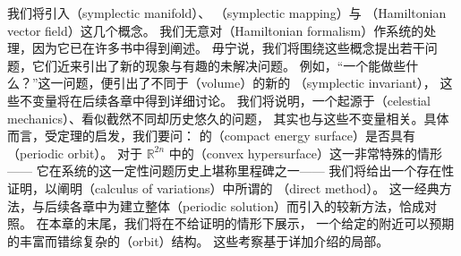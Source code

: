 
我们将引入\textbf{\trSymplecticManifold}（symplectic manifold）、%
\textbf{\trSymplecticMapping}（symplectic mapping）与%
\textbf{\trHamiltonianVectorField}（Hamiltonian vector field）这几个概念。%
我们无意对\textbf{\trHamiltonianFormalism}（Hamiltonian formalism）作系统的处理，因为它已在许多书中得到阐述。%
毋宁说，我们将围绕这些概念提出若干问题，它们近来引出了新的现象与有趣的未解决问题。%
例如，“一个\trSymplecticMapping{}能做些什么？”这一问题，便引出了不同于\textbf{\trVolume}（volume）的新的%
\textbf{\trSymplecticInvariant}（symplectic invariant），%
这些不变量将在后续各章中得到详细讨论。%
我们将说明，一个起源于\textbf{\trCelestialMechanics}（celestial mechanics）、看似截然不同却历史悠久的问题，%
其实也与这些不变量相关。具体而言，受\trPoincare{}\trRecurrence{}定理的启发，我们要问：%
\trHamiltonianVectorField{}的\textbf{\trCompact\trEnergySurface}（compact energy surface）是否具有\textbf{\trPeriodicOrbit}（periodic orbit）。%
对于 $\mathbb{R}^{2n}$ 中的\textbf{\trConvex\trHypersurface}（convex hypersurface）这一非常特殊的情形——%
它在\trHamiltonian{}系统的这一定性问题历史上堪称里程碑之一——%
我们将给出一个存在性证明，以阐明\textbf{\trCalculusOfVariations}（calculus of variations）中所谓的%
\textbf{\trDirectMethod}（direct method）。%
这一经典方法，与后续各章中为建立整体\textbf{\trPeriodicSolution}（periodic solution）而引入的较新方法，恰成对照。%
在本章的末尾，我们将在不给证明的情形下展示，%
一个给定的\trPeriodicOrbit{}附近可以预期的丰富而错综复杂的\textbf{\trOrbit}（orbit）结构。%
这些考察基于详加介绍的局部\trNonlinear\trBirkhoffInvariant。
